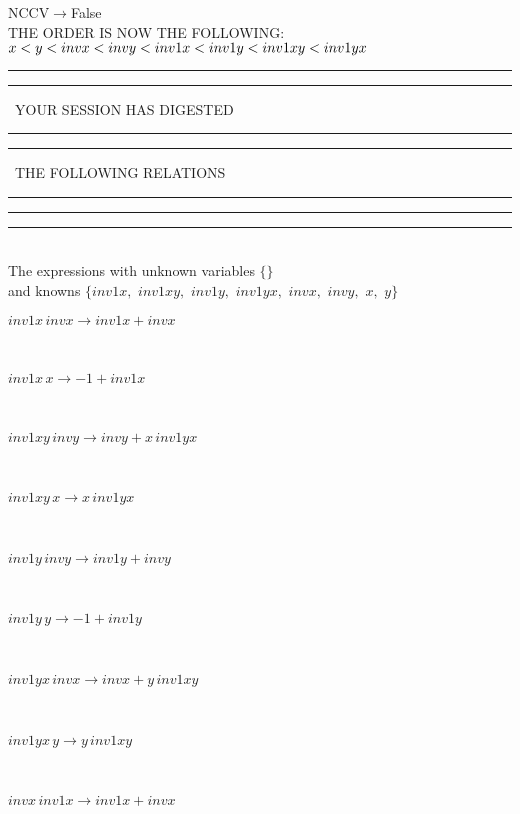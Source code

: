 NCCV$\rightarrow $False\\
THE ORDER IS NOW THE FOLLOWING:\hfil\break
$
x<y<invx<invy<inv1x<inv1y<inv1xy<inv1yx\\
$
\rule[2pt]{6in}{4pt}\hfil\break
\rule[2pt]{1.879in}{4pt}
\ YOUR SESSION HAS DIGESTED\ 
\rule[2pt]{1.879in}{4pt}\hfil\break
\rule[2pt]{1.923in}{4pt}
\ THE FOLLOWING RELATIONS\ 
\rule[2pt]{1.923in}{4pt}\hfil\break
\rule[2pt]{6in}{4pt}\hfil\break
\rule[3pt]{6in}{.7pt}\\
The expressions with unknown variables $\{\}$\\
and knowns $\{inv1x,
$ $
inv1xy,
$ $
inv1y,
$ $
inv1yx,
$ $
invx,
$ $
invy,
$ $
x,
$ $
y\}$\smallskip\\
\begin{minipage}{6in}
$
inv1x\,
 invx\rightarrow inv1x + invx
$
\end{minipage}\medskip \\
\begin{minipage}{6in}
$
inv1x\,
 x\rightarrow -1 + inv1x
$
\end{minipage}\medskip \\
\begin{minipage}{6in}
$
inv1xy\,
 invy\rightarrow invy + x\,
 inv1yx
$
\end{minipage}\medskip \\
\begin{minipage}{6in}
$
inv1xy\,
 x\rightarrow x\,
 inv1yx
$
\end{minipage}\medskip \\
\begin{minipage}{6in}
$
inv1y\,
 invy\rightarrow inv1y + invy
$
\end{minipage}\medskip \\
\begin{minipage}{6in}
$
inv1y\,
 y\rightarrow -1 + inv1y
$
\end{minipage}\medskip \\
\begin{minipage}{6in}
$
inv1yx\,
 invx\rightarrow invx + y\,
 inv1xy
$
\end{minipage}\medskip \\
\begin{minipage}{6in}
$
inv1yx\,
 y\rightarrow y\,
 inv1xy
$
\end{minipage}\medskip \\
\begin{minipage}{6in}
$
invx\,
 inv1x\rightarrow inv1x + invx
$
\end{minipage}\medskip \\
